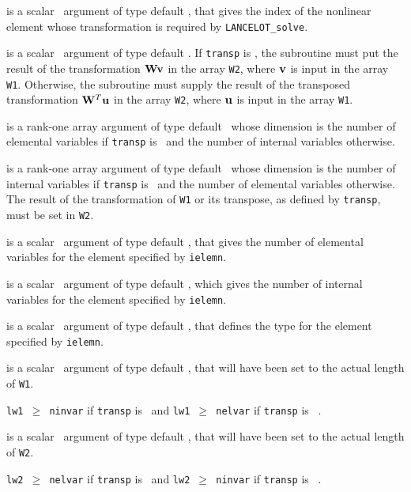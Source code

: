 \documentclass{galahad}
\newcommand{\fullpackagename}{LANC\-E\-LOT}
\newcommand{\solver}{{\tt \fullpackagename\_solve}}
\begin{document}
\begin{description}

 is a scalar \intentin\ argument of type default \integer,
that gives the index of the nonlinear element whose transformation is
required by \solver.

 is a scalar \intentin\ argument of type default \logical.
If {\tt transp} is \false, the subroutine must put the result of the
transformation ${\mathbf{W}} {\mathbf{v}}$ in the array {\tt W2}, where ${\mathbf{v}}$ is input in the
array {\tt W1}. Otherwise, the subroutine must supply the result of the
transposed transformation ${\mathbf{W}}^T {\mathbf{u}}$
in the array {\tt W2}, where ${\mathbf{u}}$ is input in the array {\tt W1}.

 is a rank-one \intentin array argument of type default \realdp\,
whose dimension is the number of elemental variables
if {\tt transp} is \false\
and the number of internal variables otherwise.

 is a rank-one \intentout array argument of type default \realdp\,
whose dimension is
the number of internal variables if {\tt transp} is
\false\ and the number of elemental variables otherwise.
The result of the transformation of {\tt W1} or its transpose, as
defined by {\tt transp}, must be set in {\tt W2}.

 is a scalar \intentin\ argument of type default \integer,
that gives the number of elemental variables for the element specified
by {\tt ielemn}.

 is a scalar \intentin\ argument of type default \integer,
which gives the number of internal variables for the element specified
by {\tt ielemn}.

 is a scalar \intentin\ argument of type default \integer,
that defines the type for the element specified
by {\tt ielemn}.

 is a scalar \intentin\ argument of type default \integer,
that will have been set to the actual length of {\tt W1}.

\restriction
{\tt lw1 $\geq$ ninvar} if {\tt transp} is \true\ and
{\tt lw1 $\geq$ nelvar} if {\tt transp} is \false\ .

 is a scalar \intentin\ argument of type default \integer,
that will have been set to the actual length of {\tt W2}.

\restriction
{\tt lw2 $\geq$ nelvar} if {\tt transp} is \true\ and
{\tt lw2 $\geq$ ninvar} if {\tt transp} is \false\ .

\end{description}
\end{document}
